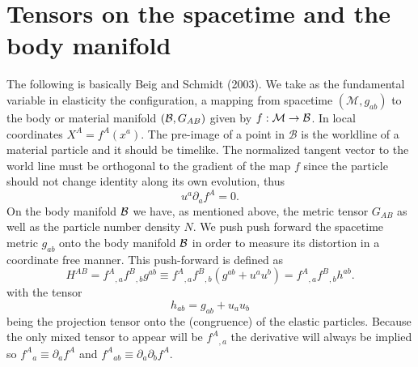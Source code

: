 \section{Tensors on the spacetime and the body manifold}

The following is basically Beig and Schmidt (2003). We take as the fundamental variable in elasticity the configuration, a mapping from spacetime $(\mathcal{M},g_{ab})$ to the body or material manifold $(\mathcal{B},G_{AB})$ given by $f:\mathcal{M}\rightarrow \mathcal{B}$. In local coordinates $X^A=f^A(x^a)$. The pre-image of a point in $\mathcal{B}$ is the worldline of a material particle and it should be timelike. The normalized tangent vector to the world line must be orthogonal to the gradient of the map $f$ since the particle should not change identity along its own evolution, thus
\begin{equation}
u^a\partial_a f^A = 0.
\end{equation}
On the body manifold $\mathcal{B}$ we have, as mentioned above, the metric tensor $G_{AB}$ as well as the particle number density $N$. We push push forward the spacetime metric $g_{ab}$ onto the body manifold $\mathcal{B}$ in order to measure its distortion in a coordinate free manner. This push-forward is defined as
\begin{equation}
H^{AB} = f^A{}_{,a}f^B{}_{,b}g^{ab} \equiv f^A{}_{,a}f^B{}_{,b}(g^{ab}+u^au^b) = f^A{}_{,a}f^B{}_{,b}h^{ab}.
\end{equation}
with the tensor
\begin{equation}
h_{ab} = g_{ab} + u_au_b
\end{equation}
being the projection tensor onto the (congruence) of the elastic particles. Because the only mixed tensor to appear will be $f^A{}_{,a}$ the derivative will always be implied so $f^A{}_a \equiv \partial_a f^A$ and $f^A{}_{ab} \equiv \partial_a\partial_b f^A$.
